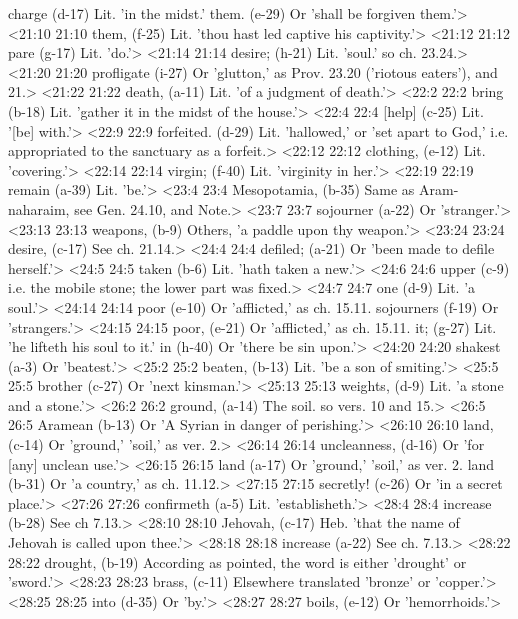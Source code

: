   charge (d-17)  Lit. 'in the midst.'
  them. (e-29)  Or 'shall be forgiven them.'>
<21:10 21:10  them, (f-25)  Lit. 'thou hast led captive his captivity.'>
<21:12 21:12  pare (g-17)  Lit. 'do.'>
<21:14 21:14  desire; (h-21)  Lit. 'soul.' so ch. 23.24.>
<21:20 21:20  profligate (i-27)  Or 'glutton,' as Prov. 23.20 ('riotous eaters'), and 21.>
<21:22 21:22  death, (a-11)  Lit. 'of a judgment of death.'>
<22:2 22:2  bring (b-18)  Lit. 'gather it in the midst of the house.'>
<22:4 22:4  [help] (c-25)  Lit. '[be] with.'>
<22:9 22:9  forfeited. (d-29)  Lit. 'hallowed,' or 'set apart to God,' i.e. appropriated to  the sanctuary as a forfeit.>
<22:12 22:12  clothing, (e-12)  Lit. 'covering.'>
<22:14 22:14  virgin; (f-40)  Lit. 'virginity in her.'>
<22:19 22:19  remain (a-39)  Lit. 'be.'>
<23:4 23:4  Mesopotamia, (b-35)  Same as Aram-naharaim, see Gen. 24.10, and Note.>
<23:7 23:7  sojourner (a-22)  Or 'stranger.'>
<23:13 23:13  weapons, (b-9)  Others, 'a paddle upon thy weapon.'>
<23:24 23:24  desire, (c-17)  See ch. 21.14.>
<24:4 24:4  defiled; (a-21)  Or 'been made to defile herself.'>
<24:5 24:5  taken (b-6)  Lit. 'hath taken a new.'>
<24:6 24:6  upper (c-9)  i.e. the mobile stone; the lower part was fixed.>
<24:7 24:7  one (d-9)  Lit. 'a soul.'>
<24:14 24:14  poor (e-10) Or 'afflicted,' as ch. 15.11.
  sojourners (f-19)  Or 'strangers.'>
<24:15 24:15  poor, (e-21)  Or 'afflicted,' as ch. 15.11.
  it; (g-27)  Lit. 'he lifteth his soul to it.'
  in (h-40)  Or 'there be sin upon.'>
<24:20 24:20  shakest (a-3)  Or 'beatest.'>
<25:2 25:2  beaten, (b-13)  Lit. 'be a son of smiting.'>
<25:5 25:5  brother (c-27)  Or 'next kinsman.'>
<25:13 25:13  weights, (d-9)  Lit. 'a stone and a stone.'>
<26:2 26:2  ground, (a-14)  The soil. so vers. 10 and 15.>
<26:5 26:5  Aramean (b-13)  Or 'A Syrian in danger of perishing.'>
<26:10 26:10  land, (c-14)  Or 'ground,' 'soil,' as ver. 2.>
<26:14 26:14  uncleanness, (d-16)  Or 'for [any] unclean use.'>
<26:15 26:15  land (a-17)  Or 'ground,' 'soil,' as ver. 2.
  land (b-31)  Or 'a country,' as ch. 11.12.>
<27:15 27:15  secretly! (c-26)  Or 'in a secret place.'>
<27:26 27:26  confirmeth (a-5)  Lit. 'establisheth.'>
<28:4 28:4  increase (b-28)  See ch 7.13.>
<28:10 28:10  Jehovah, (c-17)  Heb. 'that the name of Jehovah is called upon thee.'>
<28:18 28:18  increase (a-22)  See ch. 7.13.>
<28:22 28:22  drought, (b-19)  According as pointed, the word is either 'drought' or  'sword.'>
<28:23 28:23  brass, (c-11)  Elsewhere translated 'bronze' or 'copper.'>
<28:25 28:25  into (d-35)  Or 'by.'>
<28:27 28:27  boils, (e-12)  Or 'hemorrhoids.'>
